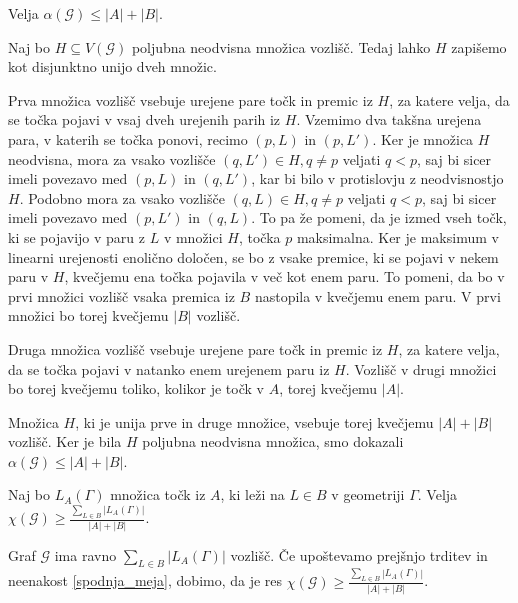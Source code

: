 \documentclass[mat1, tisk]{fmfdelo}
\begin{document}
    \begin{trditev}
        Velja $\alpha(\mathcal{G}) \leq |A| + |B|$.
    \end{trditev}

    \begin{dokaz}
        Naj bo $H \subseteq V(\mathcal{G})$ poljubna neodvisna množica vozlišč. Tedaj lahko $H$ zapišemo kot disjunktno unijo dveh množic.

        Prva množica vozlišč vsebuje urejene pare točk in premic iz $H$, za katere velja, da se točka pojavi v vsaj dveh urejenih parih iz $H$. Vzemimo dva takšna urejena para, v katerih se točka ponovi, recimo $(p, L)$ in $(p, L')$.
        Ker je množica $H$ neodvisna, mora za vsako vozlišče $(q, L') \in H, q \neq p$ veljati $q < p$, saj bi sicer imeli povezavo med $(p, L)$ in $(q, L')$, kar bi bilo v protislovju z neodvisnostjo $H$. Podobno mora 
        za vsako vozlišče $(q, L) \in H, q \neq p$ veljati $q < p$, saj bi sicer imeli povezavo med $(p, L')$ in $(q, L)$. To pa že pomeni, da je izmed vseh točk, ki se pojavijo v paru z $L$ v množici $H$, točka $p$ maksimalna.
        Ker je maksimum v linearni urejenosti enolično določen, se bo z vsake premice, ki se pojavi v nekem paru v $H$, kvečjemu ena točka pojavila v več kot enem paru. To pomeni, da bo v prvi množici vozlišč vsaka premica iz
        $B$ nastopila v kvečjemu enem paru. V prvi množici bo torej kvečjemu $|B|$ vozlišč.

        Druga množica vozlišč vsebuje urejene pare točk in premic iz $H$, za katere velja, da se točka pojavi v natanko enem urejenem paru iz $H$. Vozlišč v drugi množici bo torej kvečjemu toliko, kolikor je točk v $A$, torej kvečjemu $|A|$.
        
        Množica $H$, ki je unija prve in druge množice, vsebuje torej kvečjemu $|A| + |B|$ vozlišč. Ker je bila $H$ poljubna neodvisna množica, smo dokazali $\alpha(\mathcal{G}) \leq |A| + |B|$.
    \end{dokaz}

    \begin{trditev}
        Naj bo $L_A(\Gamma)$ množica točk iz $A$, ki leži na $L \in B$ v geometriji $\Gamma$. Velja $\chi(\mathcal{G}) \geq \frac{\sum_{L \in B}|L_A(\Gamma)|}{|A| + |B|}$.
    \end{trditev}

    \begin{dokaz}
        Graf $\mathcal{G}$ ima ravno $\sum_{L \in B}|L_A(\Gamma)|$ vozlišč. Če upoštevamo prejšnjo trditev in neenakost \ref{spodnja_meja}, dobimo, da je res $\chi(\mathcal{G}) \geq \frac{\sum_{L \in B}|L_A(\Gamma)|}{|A| + |B|}$.
    \end{dokaz}
\end{document}
